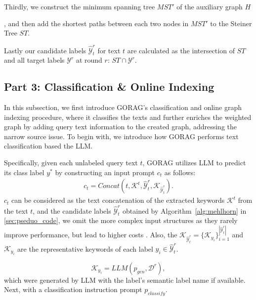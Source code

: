 Thirdly, we construct the minimum spanning tree $MST'$ of the auxiliary graph $H$ 

, and then add the shortest paths between each two nodes in $MST'$ to the Steiner Tree $ST$.

Lastly our candidate labels $\hat{\mathcal{Y}}^r_t$ for text $t$ are calculated as the intersection of $ST$ and all target labels $\mathcal{Y}^r$ at round $r$: $ST\cap\mathcal{Y}^r$.







\subsection{Part 3: Classification \& Online Indexing}\label{sec:oi}


In this subsection, we first introduce GORAG's classification and online graph indexing procedure, where it classifies the texts and further enriches the weighted graph by adding query text information to the created graph, addressing the narrow source issue.
To begin with, we introduce how GORAG performs text classification based the LLM. 

	
Specifically,
given each unlabeled query text $t$, GORAG utilizes LLM to predict its class label $y^*$ by constructing an input prompt $c_t$ as follows: 
\begin{align}
	c_t=Concat(t, \mathcal{K}^t, \hat{\mathcal{Y}}^r_t, \mathcal{K}_{\hat{\mathcal{Y}}^r_t}). 
\end{align}
 $c_t$ can be considered as the text concatenation of the extracted keywords $\mathcal{K}^t$ from the text $t$, and the candidate labels $\hat{\mathcal{Y}}^r_t$ obtained by Algorithm~\ref{alg:mehlhorn} in \autoref{sec:pseduo_code}, we omit the more complex input structures as they rarely improve performance, but lead to higher costs \cite{zhou2023lima,liu2024lost}.
 Also, the $\mathcal{K}_{\hat{\mathcal{Y}}^r_t}=\{\mathcal{K}_{y_i}\}_{i=1}^{|\hat{\mathcal{Y}}^r_t|}$
 and $\mathcal{K}_{y_i}$ are the representative keywords of each label $y_i\in \hat{\mathcal{Y}}^r_t$. 

\begin{equation}
	\mathcal{K}_{y_i}=LLM(p_{gen},\mathcal{D}^r), 
\end{equation}
which were generated by LLM with the label's semantic label name if available. 
Next, with a classification instruction prompt $p_{classify}$. 




